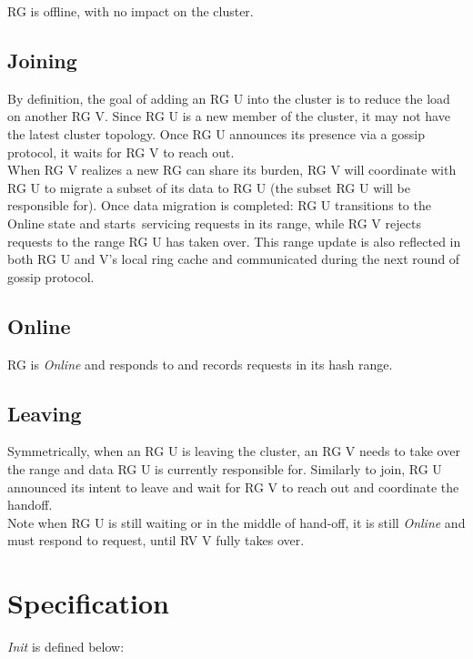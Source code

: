RG is offline, with no impact on the cluster.

\subsection{Joining}

By definition, the goal of adding an RG U into the cluster is to reduce the load
on another RG V. Since RG U is a new member of the cluster, it may not have the
latest cluster topology. Once RG U announces its presence via a gossip protocol,
it waits for RG V to reach out.\\

When RG V realizes a new RG can share its burden, RG V will coordinate with RG U
to migrate a subset of its data to RG U (the subset RG U will be responsible
for). Once data migration is completed: RG U transitions to the Online state and
starts servicing requests in its range, while RG V rejects requests to the range
RG U has taken over. This range update is also reflected in both RG U and V's
local ring cache and communicated during the next round of gossip protocol.

\subsection{Online}

RG is \textit{Online} and responds to and records requests in its hash range. 

\subsection{Leaving}

Symmetrically, when an RG U is leaving the cluster, an RG V needs to take over the
range and data RG U is currently responsible for. Similarly to join, RG U 
announced its intent to leave and wait for RG V to reach out and coordinate the
handoff. \\

Note when RG U is still waiting or in the middle of hand-off, it is still
\textit{Online} and must respond to request, until RV V fully takes over.

\section{Specification}

\textit{Init} is defined below:\\

